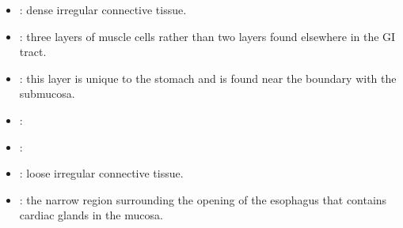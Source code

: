 \begin{itemize}
\begin{multicols}{2}
\begin{itemize}
    \item {}: dense irregular connective tissue.
    
    \begin{center}
    \end{center}
    
    \item {}:  three layers of muscle cells rather than two layers found elsewhere in the GI tract.
    
    \begin{center}
    \end{center}
    
    \item {}: this layer is unique to the stomach and is found near the boundary with the submucosa.
    
    \begin{center}
    \end{center}
    
    \item {}: 
    
    \begin{center}
    \end{center}
    
    \item {}: 
    
    \begin{center}
    \end{center}
    
    \item {}: loose irregular connective tissue.
    
    \begin{center}
    \end{center}
    
    \item {}: the narrow region surrounding the opening of the esophagus that contains cardiac glands in the mucosa.
    
    \begin{center}
    \end{center}
    

\end{itemize}
\end{multicols}
\end{itemize}
